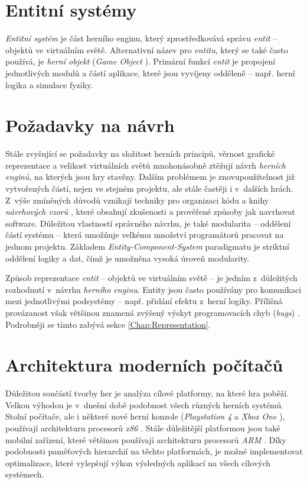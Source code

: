 \section{Entitní systémy}

\emph{Entitní systém} je část herního enginu, který zprostředkovává správu \emph{entit} -- objektů ve virtuálním světě. Alternativní název pro \emph{entitu}, který se také často používá, je \emph{herní objekt} (\emph{Game Object} \cite{UnityGo}). Primární funkcí \emph{entit} je propojení jednotlivých modulů a částí aplikace, které jsou vyvíjeny odděleně -- např. herní logika a simulace fyziky.

\section{Požadavky na návrh}

Stále zvyšující se požadavky na složitost herních principů, věrnost grafické reprezentace a velikost virtuálních světů mnohonásobně ztěžují návrh \emph{herních enginů}, na kterých jsou hry stavěny. Dalším problémem je znovupoužitelnost již vytvořených částí, nejen ve stejném projektu, ale stále častěji i v~dalších hrách. Z~výše zmíněných důvodů vznikají techniky pro organizaci kódu a knihy \emph{návrhových vzorů} \cite{DesignPatterns, GameDesignPatterns}, které obsahují zkušenosti a prověřené způsoby jak navrhovat software. Důležitou vlastností správného návrhu, je také modularita -- oddělení částí systému -- která umožňuje velkému množství programátorů pracovat na jednom projektu. Základem \emph{Entity-Component-System} paradigmatu je striktní oddělení logiky a dat, čímž je umožněna vysoká úroveň modularity. 

Způsob reprezentace \emph{entit} -- objektů ve virtuálním světě -- je jedním z~důležitých rozhodnutí v~návrhu \emph{herního enginu}. Entity jsou často používány pro komunikaci mezi jednotlivými podsystémy -- např. přidání efektu z~herní logiky. Přílišná provázanost však většinou znamená zvýšený výskyt programovacích chyb (\emph{bugs}) \cite{GameDesignPatterns}. Podrobněji se tímto zabývá sekce \ref{Chap:Representation}.

\section{Architektura moderních počítačů}

Důležitou součástí tvorby her je analýza cílové platformy, na které hra poběží. Velkou výhodou je v~dnešní době podobnost všech různých herních systémů. Stolní počítače, ale i některé nové herní konzole (\emph{Playstation 4} a \emph{Xbox One} \cite{Ps4Xbox}), používají architekturu procesorů \emph{x86} \cite{IntelX86-64, AmdX86-64}. Stále důležitější platformou jsou také mobilní zařízení, které většinou používají architekturu procesorů \emph{ARM} \cite{ARM}. Díky podobnosti paměťových hierarchií na těchto platformách, je možné implementovat optimalizace, které vylepšují výkon výsledných aplikací na všech cílových systémech.

